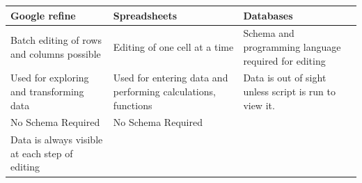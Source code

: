 \documentclass[]{book}
\begin{document}
\begin{longtable}[]{@{}lll@{}}
\toprule
\begin{minipage}[b]{0.26\columnwidth}\raggedright\strut
Google refine\strut
\end{minipage} & \begin{minipage}[b]{0.35\columnwidth}\raggedright\strut
Spreadsheets\strut
\end{minipage} & \begin{minipage}[b]{0.30\columnwidth}\raggedright\strut
Databases\strut
\end{minipage}\tabularnewline
\midrule
\endhead
\begin{minipage}[t]{0.26\columnwidth}\raggedright\strut
Batch editing of rows and columns possible\strut
\end{minipage} & \begin{minipage}[t]{0.35\columnwidth}\raggedright\strut
Editing of one cell at a time\strut
\end{minipage} & \begin{minipage}[t]{0.30\columnwidth}\raggedright\strut
Schema and programming language required for editing\strut
\end{minipage}\tabularnewline
\begin{minipage}[t]{0.26\columnwidth}\raggedright\strut
Used for exploring and transforming data\strut
\end{minipage} & \begin{minipage}[t]{0.35\columnwidth}\raggedright\strut
Used for entering data and performing calculations, functions\strut
\end{minipage} & \begin{minipage}[t]{0.30\columnwidth}\raggedright\strut
Data is out of sight unless script is run to view it.\strut
\end{minipage}\tabularnewline
\begin{minipage}[t]{0.26\columnwidth}\raggedright\strut
No Schema Required\strut
\end{minipage} & \begin{minipage}[t]{0.35\columnwidth}\raggedright\strut
No Schema Required\strut
\end{minipage} & \begin{minipage}[t]{0.30\columnwidth}\raggedright\strut
\strut
\end{minipage}\tabularnewline
\begin{minipage}[t]{0.26\columnwidth}\raggedright\strut
Data is always visible at each step of editing\strut
\end{minipage} & \begin{minipage}[t]{0.35\columnwidth}\raggedright\strut

\end{minipage}
\end{longtable}
\end{document}
